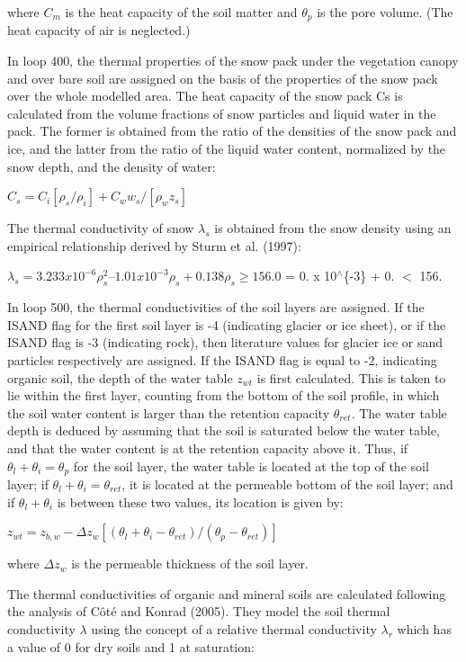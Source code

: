 where $C_m$ is the heat capacity of the soil matter and $\theta_p$ is the pore volume. (The heat capacity of air is neglected.)

In loop 400, the thermal properties of the snow pack under the vegetation canopy and over bare soil are assigned on the basis of the properties of the snow pack over the whole modelled area. The heat capacity of the snow pack Cs is calculated from the volume fractions of snow particles and liquid water in the pack. The former is obtained from the ratio of the densities of the snow pack and ice, and the latter from the ratio of the liquid water content, normalized by the snow depth, and the density of water\+:

$C_s = C_i [\rho_s /\rho_i ] + C_w w_s /[\rho_w z_s]$

The thermal conductivity of snow $\lambda_s$ is obtained from the snow density using an empirical relationship derived by Sturm et al. (1997)\+:

$\lambda_s = 3.233 x 10^{-6} \rho_s^2 – 1.01 x 10^{-3} \rho_s + 0.138 \rho_s \geq 156.0 $ = 0. x 10$^\wedge$\{-\/3\}  + 0.  $<$ 156.

In loop 500, the thermal conductivities of the soil layers are assigned. If the I\+S\+A\+N\+D flag for the first soil layer is -\/4 (indicating glacier or ice sheet), or if the I\+S\+A\+N\+D flag is -\/3 (indicating rock), then literature values for glacier ice or sand particles respectively are assigned. If the I\+S\+A\+N\+D flag is equal to -\/2, indicating organic soil, the depth of the water table $z_{wt}$ is first calculated. This is taken to lie within the first layer, counting from the bottom of the soil profile, in which the soil water content is larger than the retention capacity $\theta_{ret}$. The water table depth is deduced by assuming that the soil is saturated below the water table, and that the water content is at the retention capacity above it. Thus, if $\theta_l + \theta_i = \theta_p$ for the soil layer, the water table is located at the top of the soil layer; if $\theta_l + \theta_i = \theta_{ret}$, it is located at the permeable bottom of the soil layer; and if $\theta_l + \theta_i$ is between these two values, its location is given by\+:

$z_{wt} = z_{b,w} - \Delta z_w [(\theta_l + \theta_i - \theta_{ret})/(\theta_p - \theta_{ret})]$

where $\Delta z_w$ is the permeable thickness of the soil layer.

The thermal conductivities of organic and mineral soils are calculated following the analysis of Côté and Konrad (2005). They model the soil thermal conductivity $\lambda$ using the concept of a relative thermal conductivity $\lambda_r$ which has a value of 0 for dry soils and 1 at saturation\+:

